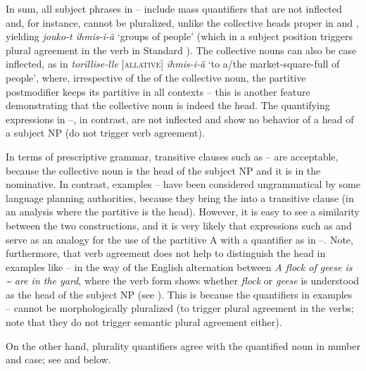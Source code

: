\documentclass[output=paper]{LSP/langsci}
\begin{document}
In sum, all subject phrases in -- include mass quantifiers that are not inflected and, for instance, cannot be pluralized, unlike the collective heads proper in  and , yielding \textit{jouko-t ihmis-i-ä} ‘groups of people’ (which in a subject position triggers plural agreement in the verb in Standard ). The collective nouns can also be case inflected, as in \textit{torillise-lle} [\textsc{allative}]\textit{ ihmis-i-ä} ‘to a/the market-square-full of people’, where, irrespective of the  of the collective noun, the partitive postmodifier keeps its partitive in all contexts – this is another feature demonstrating that the collective noun is indeed the head. The quantifying expressions in --, in contrast, are not inflected and show no behavior of a head of a subject NP (\ie  do not trigger verb agreement). 

In terms of prescriptive grammar, transitive clauses such as -- are acceptable, because the collective noun is the head of the subject NP and it is in the nominative. In contrast, examples --  have been considered ungrammatical by some language planning authorities, because they bring the  into a transitive clause (in an analysis where the partitive is the head). However, it is easy to see a similarity between the two constructions, and it is very likely that expressions such as  and  serve as an analogy for the use of the partitive A with a quantifier as in --. Note, furthermore, that verb agreement does not help to distinguish the head in examples like --  in the way of the English alternation between \textit{A flock of geese is {\textasciitilde} are in the yard}, where the verb form shows whether \textit{flock} or \textit{geese} is understood as the head of the subject NP (see \citealt[53]{Langacker2009Investigations}). This is because the quantifiers in examples --  cannot be morphologically pluralized (to trigger plural agreement in the verbs; note that they do not trigger semantic plural agreement either).

On the other hand, plurality quantifiers agree with the quantified noun in number and case; see  and  below. 

\ea \label{15-hu-ex:39}
\end{document}
